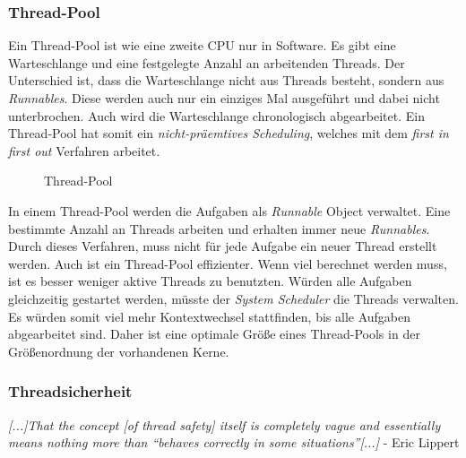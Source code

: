 \subsubsection{Thread-Pool}
Ein Thread-Pool ist wie eine zweite CPU nur in Software. Es gibt eine Warteschlange und eine festgelegte Anzahl an arbeitenden Threads. Der Unterschied ist, dass die Warteschlange nicht aus Threads besteht, sondern aus \textit{Runnables}. Diese werden auch nur ein einziges Mal ausgeführt und dabei nicht unterbrochen. Auch wird die Warteschlange chronologisch abgearbeitet. Ein Thread-Pool hat somit ein \textit{nicht-präemtives Scheduling}, welches mit dem \textit{first in first out} Verfahren arbeitet.\newpage
\begin{figure}[h]
    
    \caption{Thread-Pool\protect\footnotemark}
    \label{Thread-Pool}
\end{figure}
In einem Thread-Pool werden die Aufgaben als \textit{Runnable} Object verwaltet. Eine bestimmte Anzahl an Threads arbeiten und erhalten immer neue \textit{Runnables}. Durch dieses Verfahren, muss nicht für jede Aufgabe ein neuer Thread erstellt werden. Auch ist ein Thread-Pool effizienter. Wenn viel berechnet werden muss, ist es besser weniger aktive Threads zu benutzten. Würden alle Aufgaben gleichzeitig gestartet werden, müsste der \textit{System Scheduler} die Threads verwalten. Es würden somit viel mehr Kontextwechsel stattfinden, bis alle Aufgaben abgearbeitet sind. Daher ist eine optimale Größe eines Thread-Pools in der Größenordnung der vorhandenen Kerne.\cite{ThreadPool:Java}

\subsubsection{Threadsicherheit}\label{Threadsicherheit}
\begin{center}
    \textit{
        [...]That the concept [of thread safety] itself is completely vague and essentially means nothing more than ``behaves correctly in some situations''[...]
    } - Eric Lippert \cite{Threads:Lippert}
\end{center}

